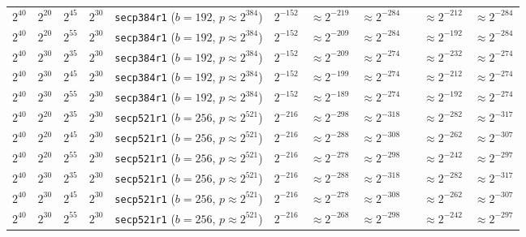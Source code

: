 \begin{table}[p]
\begin{tabular}{@{}lllllllllll@{}}
$2^{40}$	&$2^{20}$	&$2^{45}$	&$2^{30}$	&\texttt{secp384r1} ($b \!=\! 192$,\! $p \!\approx\! 2^{384}$)	&$2^{-152}$	&$\approx 2^{-219}$	& $\approx 2^{-284}$	&& $\approx 2^{-212}$	& $\approx 2^{-284}$	 \\
$2^{40}$	&$2^{20}$	&$2^{55}$	&$2^{30}$	&\texttt{secp384r1} ($b \!=\! 192$,\! $p \!\approx\! 2^{384}$)	&$2^{-152}$	&$\approx 2^{-209}$	& $\approx 2^{-284}$	&& $\approx 2^{-192}$	& $\approx 2^{-284}$	 \\
$2^{40}$	&$2^{30}$	&$2^{35}$	&$2^{30}$	&\texttt{secp384r1} ($b \!=\! 192$,\! $p \!\approx\! 2^{384}$)	&$2^{-152}$	&$\approx 2^{-209}$	& $\approx 2^{-274}$	&& $\approx 2^{-232}$	& $\approx 2^{-274}$	 \\
$2^{40}$	&$2^{30}$	&$2^{45}$	&$2^{30}$	&\texttt{secp384r1} ($b \!=\! 192$,\! $p \!\approx\! 2^{384}$)	&$2^{-152}$	&$\approx 2^{-199}$	& $\approx 2^{-274}$	&& $\approx 2^{-212}$	& $\approx 2^{-274}$	 \\
$2^{40}$	&$2^{30}$	&$2^{55}$	&$2^{30}$	&\texttt{secp384r1} ($b \!=\! 192$,\! $p \!\approx\! 2^{384}$)	&$2^{-152}$	&$\approx 2^{-189}$	& $\approx 2^{-274}$	&& $\approx 2^{-192}$	& $\approx 2^{-274}$	 \\
\midrule
$2^{40}$	&$2^{20}$	&$2^{35}$	&$2^{30}$	&\texttt{secp521r1} ($b \!=\! 256$,\! $p \!\approx\! 2^{521}$)	&$2^{-216}$	&$\approx 2^{-298}$	& $\approx 2^{-318}$	&& $\approx 2^{-282}$	& $\approx 2^{-317}$	 \\
$2^{40}$	&$2^{20}$	&$2^{45}$	&$2^{30}$	&\texttt{secp521r1} ($b \!=\! 256$,\! $p \!\approx\! 2^{521}$)	&$2^{-216}$	&$\approx 2^{-288}$	& $\approx 2^{-308}$	&& $\approx 2^{-262}$	& $\approx 2^{-307}$	 \\
$2^{40}$	&$2^{20}$	&$2^{55}$	&$2^{30}$	&\texttt{secp521r1} ($b \!=\! 256$,\! $p \!\approx\! 2^{521}$)	&$2^{-216}$	&$\approx 2^{-278}$	& $\approx 2^{-298}$	&& $\approx 2^{-242}$	& $\approx 2^{-297}$	 \\
$2^{40}$	&$2^{30}$	&$2^{35}$	&$2^{30}$	&\texttt{secp521r1} ($b \!=\! 256$,\! $p \!\approx\! 2^{521}$)	&$2^{-216}$	&$\approx 2^{-288}$	& $\approx 2^{-318}$	&& $\approx 2^{-282}$	& $\approx 2^{-317}$	 \\
$2^{40}$	&$2^{30}$	&$2^{45}$	&$2^{30}$	&\texttt{secp521r1} ($b \!=\! 256$,\! $p \!\approx\! 2^{521}$)	&$2^{-216}$	&$\approx 2^{-278}$	& $\approx 2^{-308}$	&& $\approx 2^{-262}$	& $\approx 2^{-307}$	 \\
$2^{40}$	&$2^{30}$	&$2^{55}$	&$2^{30}$	&\texttt{secp521r1} ($b \!=\! 256$,\! $p \!\approx\! 2^{521}$)	&$2^{-216}$	&$\approx 2^{-268}$	& $\approx 2^{-298}$	&& $\approx 2^{-242}$	& $\approx 2^{-297}$	 \\

\end{tabular}
\end{table}
